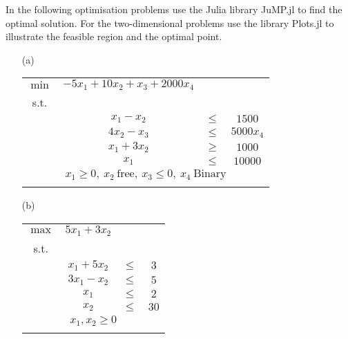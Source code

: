In the following optimisation problems use the Julia library JuMP.jl to find the optimal solution. For the two-dimensional problems use the library Plots.jl to illustrate the feasible region and the optimal point.

\begin{center}
	\begin{enumerate}
		\item[(a)]
		\begin{tabular}{*4c}
			$\min$ & $-5x_1 + 10x_2 + x_3 + 2000x_4$ & \\
			s.t. \\
			& $x_1 - x_2$ & $\leq$ & $1500$\\
			& $4x_2 - x_3$ & $\leq$ & $5000x_4$\\
			& $x_1 + 3x_2$ & $\geq$ & $1000$\\
			& $x_1$ & $\leq$ & $10000$\\
			\multicolumn{4}{c}{$x_1 \geq 0,\  x_2 \  \text{free},\  x_3 \leq 0,\  x_4 \ \text{Binary}$}\\
			\\
		\end{tabular}
		\item[(b)]
		\begin{tabular}{*4c}
			$\max$ & $5x_1 + 3x_2$ & \\
			s.t. \\
			& $x_1 + 5x_2$ & $\leq$ & $3$\\
			& $3x_1 - x_2$ & $\leq$ & $5$\\
			& $x_1$ & $\leq$ & $2$\\
			& $x_2$ & $\leq$ & $30$\\
			\multicolumn{4}{c}{$x_1, x_2 \geq 0$}\\
			\\
		\end{tabular}

	\end{enumerate}
\end{center}
